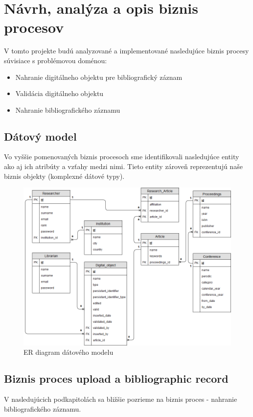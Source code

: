 \documentclass[10pt,oneside,slovak,a4paper]{article}
\begin{document}
\section{Návrh, analýza a opis biznis procesov}

V tomto projekte budú analyzované a implementované nasledujúce biznis procesy súvisiace s problémovou doménou:

\begin{itemize}
\item Nahranie digitálneho objektu pre bibliografický záznam
\item Validácia digitálneho objektu
\item Nahranie bibliografického záznamu
\end{itemize}

\newpage

\subsection{Dátový model}
Vo vyššie pomenovaných biznis procesoch sme identifikovali nasledujúce entity ako aj ich atribúty a vzťahy medzi nimi. Tieto entity zároveň reprezentujú naše biznis objekty (komplexné dátové typy).

\begin{figure} [H]
\label{datamodel}
\centering
\includegraphics[scale=0.4]{datovy_model.png} 
\caption{ER diagram dátového modelu}
\end{figure}

\subsection{Biznis proces upload a bibliographic record}
V nasledujúcich podkapitolách sa bližšie pozrieme na biznis proces - nahranie bibliografického záznamu.
\end{document}
